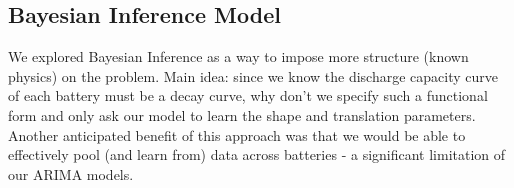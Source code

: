 \documentclass{article}
\begin{document}

\subsection{Bayesian Inference Model}
We explored Bayesian Inference as a way to impose more structure (known physics) on the problem. Main idea: since we know the discharge capacity curve of each battery must be a decay curve, why don't we specify such a functional form and only ask our model to learn the shape and translation parameters. Another anticipated benefit of this approach was that we would be able to effectively pool (and learn from) data across batteries - a significant limitation of our ARIMA models.
\end{document}
